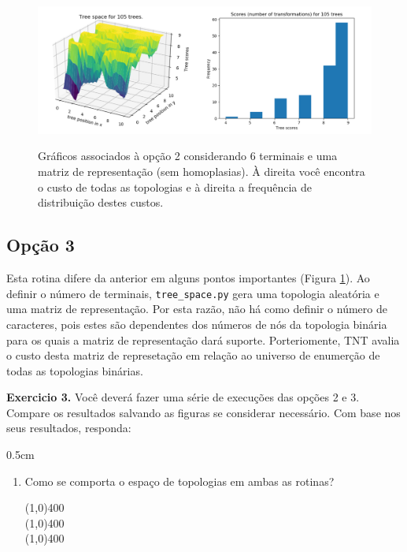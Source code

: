 \begin{refsection}
  \begin{figure}[H]
  \centering
      {\includegraphics[scale=0.65]{figures/tut3/opcao_3_6_terminals_24_characters.pdf}}
      {\caption[\textit{\textit{Structured space} }]{Gráficos associados à opção 2 considerando 6 terminais e uma matriz de representação (sem homoplasias). À direita você encontra o custo de todas as topologias e à direita a frequência de distribuição destes custos.}\label{tut3:fig:struc}}
  \end{figure}





\subsection{Opção 3}\label{tut3:subs:struc}

Esta rotina difere da anterior em alguns pontos importantes (Figura \ref{tut3:fig:struc}). Ao definir o número de terminais, \texttt{tree\_space.py} gera uma topologia aleatória e uma matriz de representação. Por esta razão, não há como definir o número de caracteres, pois estes são dependentes dos números de nós da topologia binária para os quais a matriz de representação dará suporte. Porteriomente, TNT avalia o custo desta matriz de represetação em relação ao universo de enumerção de todas as topologias binárias. \\


\begin{blackBlock}{\textbf{Exercicio 3.}}\label{tut3:ex:3.\arabic{ex}}
	Você deverá fazer uma série de execuções das opções 2 e 3. Compare os resultados salvando as figuras se considerar necessário. Com base nos seus resultados, responda:
\begin {myindentpar}{0.5cm}
\begin{enumerate}[\itshape i.]
 \item{Como se comporta o espaço de topologias em ambas as rotinas?}\label{tut3:ex3}\\
  \begin{center}
  \line(1,0){400}\\
  \line(1,0){400}\\
  \line(1,0){400}\\
  \end{center}


\end{enumerate}
\end{myindentpar}
\end{blackBlock}
\end{refsection}
